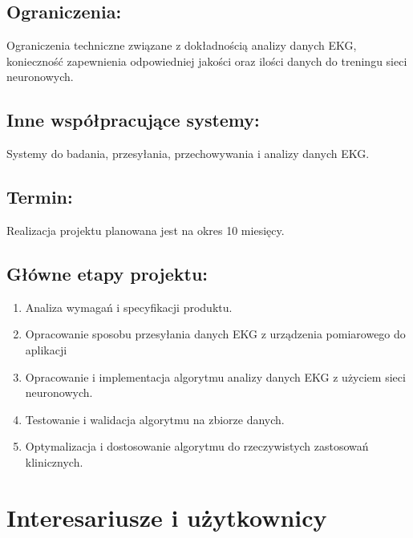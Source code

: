 \documentclass[12pt]{article}
\begin{document}
        \subsection*{Ograniczenia:}  
            Ograniczenia techniczne związane z dokładnością analizy danych EKG, konieczność zapewnienia odpowiedniej jakości oraz ilości danych do treningu sieci neuronowych.  

        \subsection*{Inne współpracujące systemy:}
            Systemy do badania, przesyłania, przechowywania i analizy danych EKG.  

        \subsection*{Termin:}  
            Realizacja projektu planowana jest na okres 10 miesięcy.  

        \subsection*{Główne etapy projektu:}
            \begin{enumerate}
                \item
                Analiza wymagań i specyfikacji produktu.  

                \item
                Opracowanie sposobu przesyłania danych EKG z urządzenia pomiarowego do aplikacji  
                
                \item
                Opracowanie i implementacja algorytmu analizy danych EKG z użyciem sieci neuronowych.   
                
                \item
                Testowanie i walidacja algorytmu na zbiorze danych.  
                
                \item
                Optymalizacja i dostosowanie algorytmu do rzeczywistych zastosowań klinicznych. 
            \end{enumerate}

    \section{Interesariusze i użytkownicy}
\end{document}
